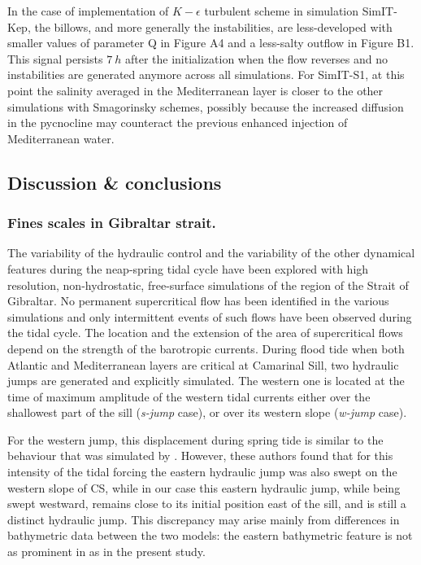 In the case of implementation of $K-\epsilon$ turbulent scheme in simulation SimIT-Kep, the billows, and more generally the instabilities, are less-developed with smaller values of parameter Q in Figure A4 and a less-salty outflow in Figure B1. This signal persists $7\ h$ after the initialization when the flow reverses and no instabilities are generated anymore across all simulations. For SimIT-S1, at this point the salinity averaged in the Mediterranean layer is closer to the other simulations with Smagorinsky schemes, possibly because the increased diffusion in the pycnocline may counteract the previous enhanced injection of Mediterranean water.


\subsection{Discussion \& conclusions}
\subsubsection{Fines scales in Gibraltar strait.}
The variability of the hydraulic control and the variability of the other dynamical features during the neap-spring tidal cycle have been explored with high resolution, non-hydrostatic, free-surface simulations of the region of the Strait of Gibraltar. No permanent supercritical flow has been identified in the various simulations and only intermittent events of such flows have been observed during the tidal cycle. The location and the extension of the area of supercritical flows depend on the strength of the barotropic currents. During flood tide when both Atlantic and Mediterranean layers are critical at Camarinal Sill, two hydraulic jumps are generated and explicitly simulated. The western one is located at the time of maximum amplitude of the western tidal currents either over the shallowest part of the sill (\textit{s-jump} case), or over its western slope (\textit{w-jump} case). 

For the western jump, this displacement during spring tide is similar to the behaviour that was simulated by \citet{sanchez-garrido_2011}. However, these authors found that for this intensity of the tidal forcing the eastern hydraulic jump was also swept on the western slope of CS, while in our case this eastern hydraulic jump, while being swept westward, remains close to its initial position east of the sill, and is still a distinct hydraulic jump. This discrepancy may arise mainly from differences in bathymetric data between the two models: the eastern bathymetric feature is not as prominent in \citet{sanchez-garrido_2011} as in the present study.

